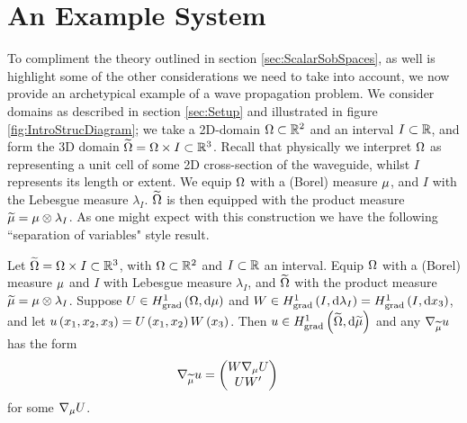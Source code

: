 \section{An Example System}
To compliment the theory outlined in section \ref{sec:ScalarSobSpaces}, as well is highlight some of the other considerations we need to take into account, we now provide an archetypical example of a wave propagation problem.
We consider domains as described in section \ref{sec:Setup} and illustrated in figure \ref{fig:IntroStrucDiagram}; we take a 2D-domain $\Omega\subset\mathbb{R}^2$ and an interval $I\subset\mathbb{R}$, and form the 3D domain $\widetilde{\Omega} = \Omega\times I\subset\mathbb{R}^3$.
Recall that physically we interpret $\Omega$ as representing a unit cell of some 2D cross-section of the waveguide, whilst $I$ represents its length or extent.
We equip $\Omega$ with a (Borel) measure $\mu$, and $I$ with the Lebesgue measure $\lambda_I$.
$\widetilde{\Omega}$ is then equipped with the product measure $\widetilde{\mu}=\mu\otimes\lambda_I$.
As one might expect with this construction we have the following ``separation of variables" style result.
\begin{prop}
	Let $\widetilde{\Omega} = \Omega\times I\subset\mathbb{R}^3$, with $\Omega\subset\mathbb{R}^2$ and $I\subset\mathbb{R}$ an interval.
	Equip $\Omega$ with a (Borel) measure $\mu$ and $I$ with Lebesgue measure $\lambda_I$, and $\widetilde{\Omega}$ with the product measure $\widetilde{\mu}=\mu\otimes\lambda_I$.
	Suppose $U\in H^1_\mathrm{grad}\left( \Omega, \mathrm{d}\mu \right)$ and $W\in H^1_\mathrm{grad}\left( I, \mathrm{d}\lambda_I \right)=H^1_\mathrm{grad}\left( I, \mathrm{d}x_3 \right)$, and let $u\left( x_1,x_2,x_3 \right)=U\left( x_1,x_2 \right)W\left( x_3 \right)$.
	Then $u\in H^1_\mathrm{grad}\left( \widetilde{\Omega}, \mathrm{d}\widetilde{\mu} \right)$ and any $\nabla_{\widetilde{\mu}} u$ has the form
	\begin{align*}
		\nabla_{\widetilde{\mu}} u &= \begin{pmatrix} W\nabla_\mu U \\ U W' \end{pmatrix}
	\end{align*}
	for some $\nabla_\mu U$.
\end{prop}
